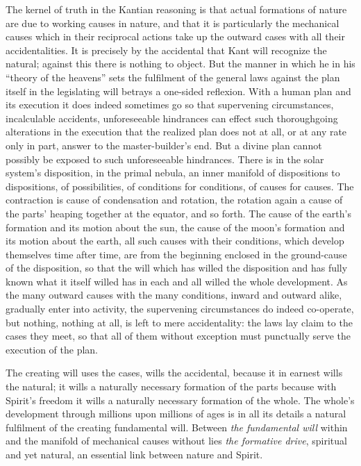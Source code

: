 \documentclass[12pt,a4paper]{book}
\begin{document}
The kernel of truth in the Kantian reasoning is that actual formations of nature are due to working causes in
nature, and that it is particularly the mechanical causes which in their reciprocal actions take up the outward
cases with all their accidentalities. It is precisely by the accidental that Kant will recognize the natural;
against this there is nothing to object. But the manner in which he in his ``theory of the heavens'' sets the
fulfilment of the general laws against the plan itself in the legislating will betrays a one-sided reflexion. With
a human plan and its execution it does indeed sometimes go so that supervening circumstances, incalculable
accidents, unforeseeable hindrances can effect such thoroughgoing alterations in the execution that the realized
plan does not at all, or at any rate only in part, answer to the master-builder's end. But a divine plan cannot
possibly be exposed to such unforeseeable hindrances.
There is in the solar system's disposition, in the primal nebula, an inner manifold of dispositions to
dispositions, of possibilities, of conditions for conditions, of causes for causes. The contraction is cause of
condensation and rotation, the rotation again a cause of the parts' heaping together at the equator, and so forth.
The cause of the earth's formation and its motion about the sun, the cause of the moon's formation and its motion
about the earth, all such causes with their conditions, which develop themselves time after time, are from the
beginning enclosed in the ground-cause of the disposition, so that the will which has willed the disposition and
has fully known what it itself willed has in each and all willed the whole development. As the many outward causes
with the many conditions, inward and outward alike, gradually enter into activity, the supervening circumstances
do indeed co-operate, but nothing, nothing at all, is left to mere accidentality: the laws lay claim to the cases
they meet, so that all of them without exception must punctually serve the execution of the plan.

The creating will uses the cases, wills the accidental, because it in earnest wills the natural; it wills a
naturally necessary formation of the parts because with Spirit's freedom it wills a naturally necessary formation
of the whole. The whole's development through millions upon millions of ages is in all its details a natural
fulfilment of the creating fundamental will. Between \emph{the fundamental will} within and the manifold of
mechanical causes without lies \emph{the formative drive}, spiritual and yet natural, an essential link between
nature and Spirit.
\end{document}

